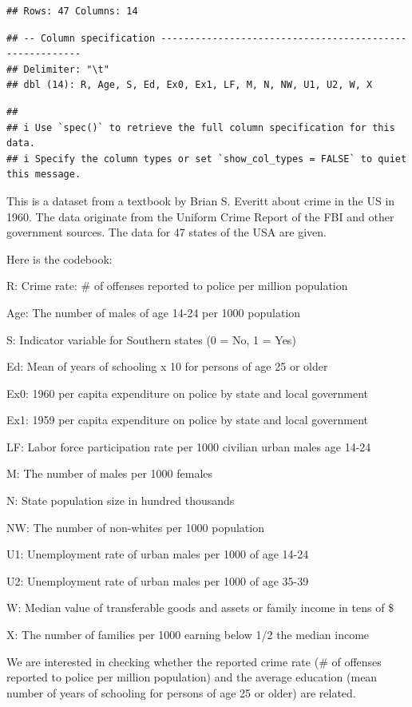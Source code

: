 \documentclass[
]{article}
\begin{document}
\begin{verbatim}
## Rows: 47 Columns: 14
\end{verbatim}

\begin{verbatim}
## -- Column specification --------------------------------------------------------
## Delimiter: "\t"
## dbl (14): R, Age, S, Ed, Ex0, Ex1, LF, M, N, NW, U1, U2, W, X
\end{verbatim}

\begin{verbatim}
## 
## i Use `spec()` to retrieve the full column specification for this data.
## i Specify the column types or set `show_col_types = FALSE` to quiet this message.
\end{verbatim}

This is a dataset from a textbook by Brian S. Everitt about crime in the
US in 1960. The data originate from the Uniform Crime Report of the FBI
and other government sources. The data for 47 states of the USA are
given.

Here is the codebook:

R: Crime rate: \# of offenses reported to police per million population

Age: The number of males of age 14-24 per 1000 population

S: Indicator variable for Southern states (0 = No, 1 = Yes)

Ed: Mean of years of schooling x 10 for persons of age 25 or older

Ex0: 1960 per capita expenditure on police by state and local government

Ex1: 1959 per capita expenditure on police by state and local government

LF: Labor force participation rate per 1000 civilian urban males age
14-24

M: The number of males per 1000 females

N: State population size in hundred thousands

NW: The number of non-whites per 1000 population

U1: Unemployment rate of urban males per 1000 of age 14-24

U2: Unemployment rate of urban males per 1000 of age 35-39

W: Median value of transferable goods and assets or family income in
tens of \$

X: The number of families per 1000 earning below 1/2 the median income

We are interested in checking whether the reported crime rate (\# of
offenses reported to police per million population) and the average
education (mean number of years of schooling for persons of age 25 or
older) are related.
\end{document}
